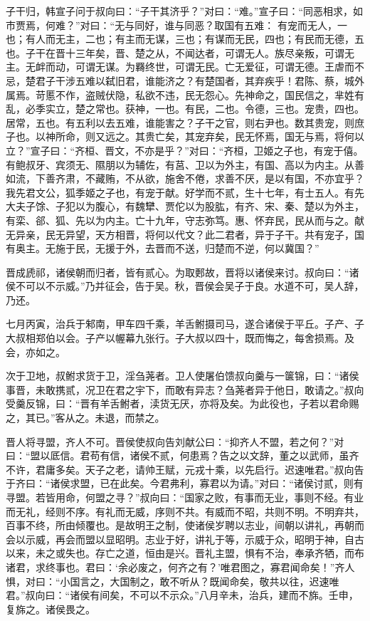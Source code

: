 \documentclass[a4paper,12pt,UTF8,twoside]{ctexbook}
\begin{document}
子干归，韩宣子问于叔向曰：“子干其济乎？”对曰：“难。”宣子曰：“同恶相求，如市贾焉，何难？”对曰：“无与同好，谁与同恶？取国有五难： 有宠而无人，一也；有人而无主，二也；有主而无谋，三也；有谋而无民，四也；有民而无德，五也。子干在晋十三年矣，晋、楚之从，不闻达者，可谓无人。族尽亲叛，可谓无主。无衅而动，可谓无谋。为羇终世，可谓无民。亡无爱征，可谓无德。王虐而不忌，楚君子干涉五难以弑旧君，谁能济之？有楚国者，其弃疾乎！君陈、蔡，城外属焉。苛慝不作，盗贼伏隐，私欲不违，民无怨心。先神命之，国民信之，芈姓有乱，必季实立，楚之常也。获神，一也。有民，二也。令德，三也。宠贵，四也。居常，五也。有五利以去五难，谁能害之？子干之官，则右尹也。数其贵宠，则庶子也。以神所命，则又远之。其贵亡矣，其宠弃矣，民无怀焉，国无与焉，将何以立？”宣子曰：“齐桓、晋文，不亦是乎？”对曰：“齐桓，卫姬之子也，有宠于僖。有鲍叔牙、宾须无、隰朋以为辅佐，有莒、卫以为外主，有国、高以为内主。从善如流，下善齐肃，不藏贿，不从欲，施舍不倦，求善不厌，是以有国，不亦宜乎？我先君文公，狐季姬之子也，有宠于献。好学而不贰，生十七年，有士五人。有先大夫子馀、子犯以为腹心，有魏犫、贾佗以为股肱，有齐、宋、秦、楚以为外主，有栾、郤、狐、先以为内主。亡十九年，守志弥笃。惠、怀弃民，民从而与之。献无异亲，民无异望，天方相晋，将何以代文？此二君者，异于子干。共有宠子，国有奥主。无施于民，无援于外，去晋而不送，归楚而不逆，何以冀国？”

晋成虒祁，诸侯朝而归者，皆有贰心。为取郠故，晋将以诸侯来讨。叔向曰：“诸侯不可以不示威。”乃并征会，告于吴。秋，晋侯会吴子于良。水道不可，吴人辞，乃还。

七月丙寅，治兵于邾南，甲车四千乘，羊舌鲋摄司马，遂合诸侯于平丘。子产、子大叔相郑伯以会。子产以幄幕九张行。子大叔以四十，既而悔之，每舍损焉。及会，亦如之。

次于卫地，叔鲋求货于卫，淫刍荛者。卫人使屠伯馈叔向羹与一箧锦，曰：“诸侯事晋，未敢携贰，况卫在君之宇下，而敢有异志？刍荛者异于他日，敢请之。”叔向受羹反锦，曰：“晋有羊舌鲋者，渎货无厌，亦将及矣。为此役也，子若以君命赐之，其已。”客从之。未退，而禁之。

晋人将寻盟，齐人不可。晋侯使叔向告刘献公曰：“抑齐人不盟，若之何？”对曰：“盟以厎信。君苟有信，诸侯不贰，何患焉？告之以文辞，董之以武师，虽齐不许，君庸多矣。天子之老，请帅王赋，元戎十乘，以先启行。迟速唯君。”叔向告于齐曰：“诸侯求盟，已在此矣。今君弗利，寡君以为请。”对曰：“诸侯讨贰，则有寻盟。若皆用命，何盟之寻？”叔向曰：“国家之败，有事而无业，事则不经。有业而无礼，经则不序。有礼而无威，序则不共。有威而不昭，共则不明。不明弃共，百事不终，所由倾覆也。是故明王之制，使诸侯岁聘以志业，间朝以讲礼，再朝而会以示威，再会而盟以显昭明。志业于好，讲礼于等，示威于众，昭明于神，自古以来，未之或失也。存亡之道，恒由是兴。晋礼主盟，惧有不治，奉承齐牺，而布诸君，求终事也。君曰：‘余必废之，何齐之有？’唯君图之，寡君闻命矣！”齐人惧，对曰：“小国言之，大国制之，敢不听从？既闻命矣，敬共以往，迟速唯君。”叔向曰：“诸侯有间矣，不可以不示众。”八月辛未，治兵，建而不旆。壬申，复旆之。诸侯畏之。
\end{document}
